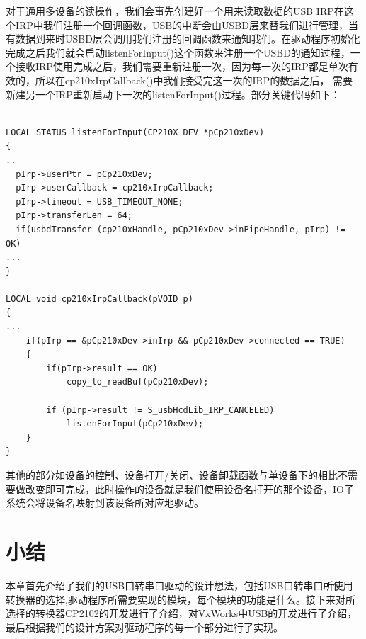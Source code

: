 	
	对于通用多设备的读操作，我们会事先创建好一个用来读取数据的USB IRP在这个IRP中我们注册一个回调函数，USB的中断会由USBD层来替我们进行管理，当有数据到来时USBD层会调用我们注册的回调函数来通知我们。在驱动程序初始化完成之后我们就会启动listenForInput()这个函数来注册一个USBD的通知过程，一个接收IRP使用完成之后，我们需要重新注册一次，因为每一次的IRP都是单次有效的，所以在cp210xIrpCallback()中我们接受完这一次的IRP的数据之后， 需要新建另一个IRP重新启动下一次的listenForInput()过程。部分关键代码如下：
\lstset{language=C}
\begin{lstlisting}

LOCAL STATUS listenForInput(CP210X_DEV *pCp210xDev)
{
..
  pIrp->userPtr = pCp210xDev;
  pIrp->userCallback = cp210xIrpCallback;
  pIrp->timeout = USB_TIMEOUT_NONE;
  pIrp->transferLen = 64;
  if(usbdTransfer (cp210xHandle, pCp210xDev->inPipeHandle, pIrp) != OK)
...
}

LOCAL void cp210xIrpCallback(pVOID p)
{
...
	if(pIrp == &pCp210xDev->inIrp && pCp210xDev->connected == TRUE)
	{
		if(pIrp->result == OK)
			copy_to_readBuf(pCp210xDev);
			
		if (pIrp->result != S_usbHcdLib_IRP_CANCELED)
			listenForInput(pCp210xDev);
	}
}

\end{lstlisting}




其他的部分如设备的控制、设备打开/关闭、设备卸载函数与单设备下的相比不需要做改变即可完成，此时操作的设备就是我们使用设备名打开的那个设备，IO子系统会将设备名映射到该设备所对应地驱动。









\section{小结}
	本章首先介绍了我们的USB口转串口驱动的设计想法，包括USB口转串口所使用转换器的选择,驱动程序所需要实现的模块，每个模块的功能是什么。接下来对所选择的转换器CP2102的开发进行了介绍，对VxWorks中USB的开发进行了介绍，最后根据我们的设计方案对驱动程序的每一个部分进行了实现。



